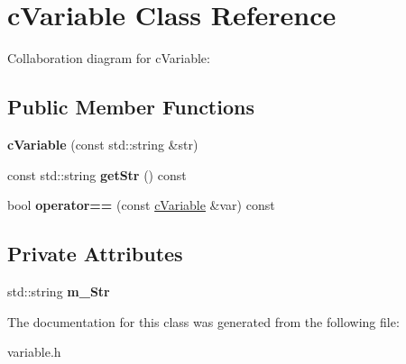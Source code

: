 \hypertarget{classcVariable}{\section{c\-Variable Class Reference}
\label{classcVariable}
}


Collaboration diagram for c\-Variable\-:
\subsection*{Public Member Functions}
\begin{DoxyCompactItemize}
\item 
\hypertarget{classcVariable_a2cb49ca00671e97cf69e5f184840458d}{{\bfseries c\-Variable} (const std\-::string \&str)}\label{classcVariable_a2cb49ca00671e97cf69e5f184840458d}

\item 
\hypertarget{classcVariable_ae3f7fff180632a744d54391d69df061b}{const std\-::string {\bfseries get\-Str} () const }\label{classcVariable_ae3f7fff180632a744d54391d69df061b}

\item 
\hypertarget{classcVariable_a3c6374e812fbb95f9acb4983666f36ba}{bool {\bfseries operator==} (const \hyperlink{classcVariable}{c\-Variable} \&var) const }\label{classcVariable_a3c6374e812fbb95f9acb4983666f36ba}

\end{DoxyCompactItemize}
\subsection*{Private Attributes}
\begin{DoxyCompactItemize}
\item 
\hypertarget{classcVariable_a21ed6c7259f7e8dbe4be083ff851bad5}{std\-::string {\bfseries m\-\_\-\-Str}}\label{classcVariable_a21ed6c7259f7e8dbe4be083ff851bad5}

\end{DoxyCompactItemize}


The documentation for this class was generated from the following file\-:\begin{DoxyCompactItemize}
\item 
variable.\-h\end{DoxyCompactItemize}

